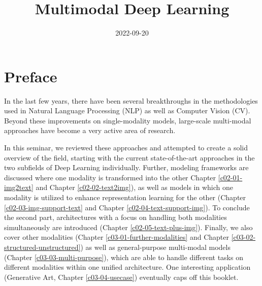 \documentclass[
]{krantz}
\title{Multimodal Deep Learning}
\author{}
\date{\vspace{-2.5em}2022-09-20}
\begin{document}
\maketitle


\thispagestyle{empty}

\begin{center}
\end{center}

\setlength{\abovedisplayskip}{-5pt}
\setlength{\abovedisplayshortskip}{-5pt}

{
\hypersetup{linkcolor=}
\setcounter{tocdepth}{1}
\tableofcontents
}
\hypertarget{preface}{%
\chapter*{Preface}\label{preface}}


In the last few years, there have been several breakthroughs in the methodologies used in Natural Language Processing (NLP) as well as Computer Vision (CV). Beyond these improvements on single-modality models, large-scale multi-modal approaches have become a very active area of research.

In this seminar, we reviewed these approaches and attempted to create a solid overview of the field, starting with the current state-of-the-art approaches in the two subfields of Deep Learning individually. Further, modeling frameworks are discussed where one modality is transformed into the other Chapter \ref{c02-01-img2text} and Chapter \ref{c02-02-text2img}), as well as models in which one modality is utilized to enhance representation learning for the other (Chapter \ref{c02-03-img-support-text} and Chapter \ref{c02-04-text-support-img}). To conclude the second part, architectures with a focus on handling both modalities simultaneously are introduced (Chapter \ref{c02-05-text-plus-img}). Finally, we also cover other modalities (Chapter \ref{c03-01-further-modalities} and Chapter \ref{c03-02-structured-unstructured}) as well as general-purpose multi-modal models (Chapter \ref{c03-03-multi-purpose}), which are able to handle different tasks on different modalities within one unified architecture. One interesting application (Generative Art, Chapter \ref{c03-04-usecase}) eventually caps off this booklet.
\end{document}
